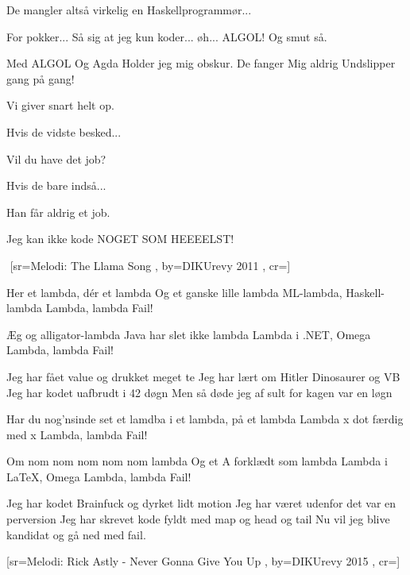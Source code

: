 \documentclass[pdftex,12pt]{article}
\begin{document}
\begin{songs}{}
\endverse
\beginverse
De mangler altså virkelig en Haskellprogrammør...

\endverse
\beginverse
For pokker... Så sig at jeg kun koder... øh... ALGOL! Og smut så.

\endverse
\beginverse
Med ALGOL
Og Agda
Holder jeg mig obskur.
De fanger
Mig aldrig
Undslipper gang på gang!

\endverse
\beginverse
Vi giver snart helt op.

\endverse
\beginverse
Hvis de vidste besked...

\endverse
\beginverse
Vil du have det job?

\endverse
\beginverse
Hvis de bare indså...

\endverse
\beginverse
Han får aldrig et job.

\endverse
\beginverse
Jeg kan ikke kode
NOGET
SOM
HEEEELST!

\endverse
\endsong



﻿%
[sr={Melodi: The Llama Song}
,
by={DIKUrevy 2011}
,
cr={}]\hypertarget{$lambda$-kalkylen}{}
\label{song21}

\beginverse
Her et lambda, dér et lambda
Og et ganske lille lambda
ML-lambda, Haskell-lambda
Lambda, lambda
Fail!

\endverse
\beginverse
Æg og alligator-lambda
Java har slet ikke lambda
Lambda i .NET, Omega
Lambda, lambda
Fail!

\endverse
\beginverse
Jeg har fået value
og drukket meget te
Jeg har lært om Hitler
Dinosaurer og VB
Jeg har kodet uafbrudt i 42 døgn
Men så døde jeg af sult
for kagen var en løgn

\endverse
\beginverse
Har du nog'nsinde set et lamdba
i et lambda, på et lambda
Lambda x dot færdig med x
Lambda, lambda
Fail!

\endverse
\beginverse
Om nom nom nom nom nom lambda
Og et A forklædt som lambda
Lambda i \LaTeX, Omega
Lambda, lambda
Fail!

\endverse
\beginverse
Jeg har kodet Brainfuck
og dyrket lidt motion
Jeg har været udenfor
det var en perversion
Jeg har skrevet kode fyldt med map og head og tail
Nu vil jeg blive kandidat
og gå ned med fail.

\endverse
\endsong



[sr={Melodi: Rick Astly - Never Gonna Give You Up}
,
by={DIKUrevy 2015}
,
cr={}]\hypertarget{Forever DIKU}{}
\label{song22}


\end{songs}
\end{document}
